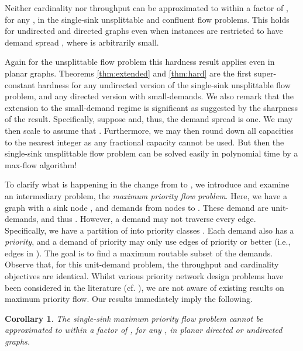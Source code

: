 \documentclass[12pt]{article}
\newtheorem{cor}[thm]{Corollary}
\begin{document}
\begin{thm}
\label{thm:hard} Neither cardinality nor throughput can be approximated to
within a factor of , for any
, in the single-sink unsplittable and confluent flow problems.
This holds for  undirected and directed graphs even
when instances are restricted to have demand spread
, where  is arbitrarily small.
\end{thm}
Again for the unsplittable flow problem this hardness result applies even in planar graphs.
Theorems \ref{thm:extended} and \ref{thm:hard} are the first super-constant hardness for any undirected
version of the single-sink unsplittable flow problem, and any directed version with small-demands.
We also remark that the extension to the small-demand regime is significant as suggested by the sharpness of the result.
Specifically, suppose  and, thus, the demand spread is one. We may then scale to assume that .
Furthermore, we may then round down all capacities to the nearest integer as any fractional capacity cannot be used.
But then the single-sink unsplittable flow problem can be solved easily in polynomial time by a max-flow algorithm!

To clarify what is happening in the change from  to , we introduce
and examine an intermediary problem, the {\em maximum priority flow problem}.
Here, we have a graph  with a sink node , and demands from nodes  to .
These demand are unit-demands, and thus . However, a demand may not traverse every edge.
Specifically, we have a partition of  into priority classes . Each demand also has a {\em priority}, and
a demand of priority  may only use edges of priority  or better (i.e., edges in ).
The goal is to find a maximum routable subset of the demands. Observe that, for this unit-demand problem, the
throughput and cardinality objectives are identical.
Whilst various priority network design problems have been considered in the literature (cf. \cite{charikar2004resource,chuzhoy2008approximability}),
we are not aware of existing results on maximum priority flow. Our results immediately imply the following.
\begin{cor}
\label{cor:priority}
The single-sink maximum priority flow problem
cannot be approximated to within a factor of , for any , in planar
directed or undirected graphs.
\end{cor}
\end{document}
